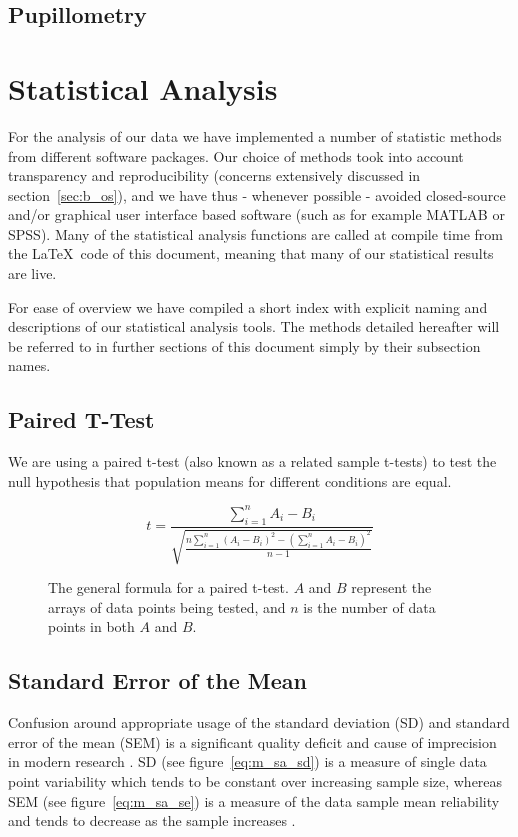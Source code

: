 	\subsection{Pupillometry}\label{sec:m_om_pm}
    \section{Statistical Analysis}\label{sec:m_sa}
	For the analysis of our data we have implemented a number of statistic methods from different software packages.
	Our choice of methods took into account transparency and reproducibility (concerns extensively discussed in section~\ref{sec:b_os}), and we have thus - whenever possible - avoided closed-source and/or graphical user interface based software (such as for example MATLAB\textsuperscript{\small\textregistered} or SPSS\textsuperscript{\small\textregistered}).
	Many of the statistical analysis functions are called at compile time from the \LaTeX\ code of this document, meaning that many of our statistical results are live.
	
	For ease of overview we have compiled a short index with explicit naming and descriptions of our statistical analysis tools.
	The methods detailed hereafter will be referred to in further sections of this document simply by their subsection names.
	\subsection{Paired T-Test}\label{sec:m_sa_rs}
	    We are using a paired t-test (also known as a related sample t-tests) to test the null hypothesis that population means for different conditions are equal.
	    \begin{figure}[H]
		\[ t = \frac{\sum\limits_{i=1}^n A_{i}-B_{i}}{\sqrt{\frac{n \sum\limits_{i=1}^n (A_{i}-B_{i})^{2} - \left(\sum\limits_{i=1}^n A_{i}-B_{i}\right)^{2}}{n-1}}} \]
		\caption{The general formula for a paired t-test. $A$ and $B$ represent the arrays of data points being tested, and $n$ is the number of data points in both $A$ and $B$.}
		\label{eq:m_sa_pt}
	    \end{figure}
	\subsection{Standard Error of the Mean}\label{sec:m_sa_se}
	    Confusion around appropriate usage of the standard deviation (SD) and standard error of the mean (SEM) is a significant quality deficit and cause of imprecision in modern research \cite{Nagele2003}.
	    SD (see figure~\ref{eq:m_sa_sd}) is a measure of single data point variability which tends to be constant over increasing sample size, 
	    whereas SEM (see figure~\ref{eq:m_sa_se}) is a measure of the data sample mean reliability and tends to decrease as the sample increases \cite{Altman2005,Streiner1996}.
	    
